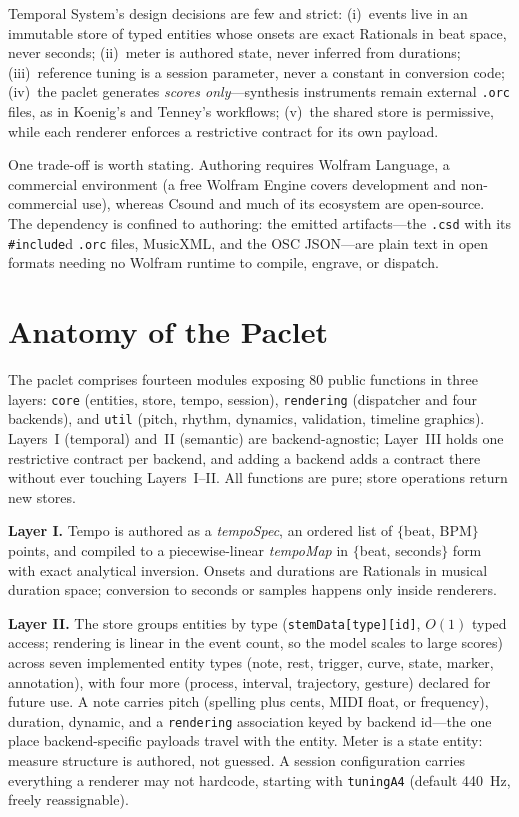 \documentclass[runningheads,a4paper]{llncs}
\begin{document}
Temporal System's design decisions are few and strict: (i)~events live in an immutable
store of typed entities whose onsets are exact Rationals in beat space,
never seconds; (ii)~meter is authored state, never inferred from durations;
(iii)~reference tuning is a session parameter, never a constant in
conversion code; (iv)~the paclet generates \emph{scores only}---synthesis
instruments remain external \texttt{.orc} files, as in Koenig's and Tenney's
workflows; (v)~the shared store is permissive, while each renderer enforces
a restrictive contract for its own payload.

One trade-off is worth stating. Authoring requires Wolfram Language, a
commercial environment (a free Wolfram Engine covers development and
non-commercial use), whereas Csound and much of its ecosystem are open-source.
The dependency is confined to authoring: the emitted artifacts---the
\texttt{.csd} with its \texttt{\#include}d \texttt{.orc} files, MusicXML, and
the OSC JSON---are plain text in open formats needing no Wolfram runtime to
compile, engrave, or dispatch.

\section{Anatomy of the Paclet}

The paclet comprises fourteen modules exposing 80 public functions in three
layers: \texttt{core} (entities, store, tempo, session), \texttt{rendering}
(dispatcher and four backends), and \texttt{util} (pitch, rhythm, dynamics,
validation, timeline graphics). Layers~I (temporal) and~II (semantic) are
backend-agnostic; Layer~III holds one restrictive contract per backend, and
adding a backend adds a contract there without ever touching Layers~I--II. All
functions are pure; store operations return new stores.

\textbf{Layer I.} Tempo is authored as a \emph{tempoSpec}, an ordered list
of $\{$beat, BPM$\}$ points, and compiled to a piecewise-linear
\emph{tempoMap} in $\{$beat, seconds$\}$ form with exact analytical
inversion. Onsets and durations are Rationals in musical duration space;
conversion to seconds or samples happens only inside renderers.

\textbf{Layer II.} The store groups entities by type
(\texttt{stemData[type][id]}, $O(1)$ typed access; rendering is linear in the
event count, so the model scales to large scores) across seven implemented
entity types (note, rest, trigger, curve, state, marker, annotation), with four
more (process, interval, trajectory, gesture) declared for future use. A note carries pitch (spelling plus cents, MIDI float,
or frequency), duration, dynamic, and a \texttt{rendering} association keyed by
backend id---the one place backend-specific payloads travel with the entity.
Meter is a state entity: measure structure is authored, not guessed. A session
configuration carries everything a renderer may not hardcode, starting with
\texttt{tuningA4} (default 440~Hz, freely reassignable).
\end{document}
